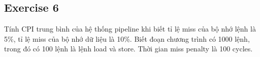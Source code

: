 \subsection{Exercise 6}
Tính CPI trung bình của hệ thống pipeline khi biết tỉ lệ miss của bộ nhớ lệnh là 5\%, tỉ lệ miss của bộ nhớ dữ liệu là 10\%.
Biết đoạn chương trình có 1000 lệnh, trong đó có 100 lệnh là lệnh load và store. Thời gian miss penalty là 100 cycles.

